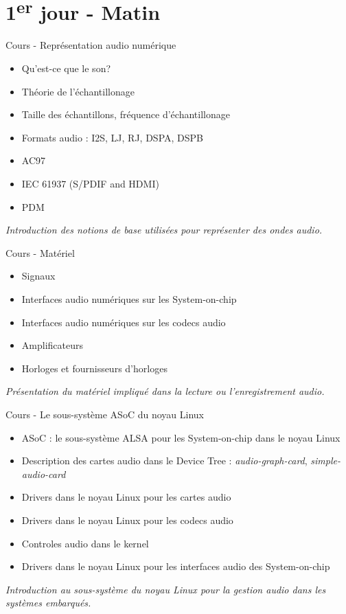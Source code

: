 \documentclass[a4paper,12pt,obeyspaces,spaces,hyphens]{article}
\begin{document}
\feshowtitle

\feshowinfo

\section{1\textsuperscript{er} jour - Matin}

\feagendatwocolumn
{Cours - Représentation audio numérique}
{
  \begin{itemize}
  \item Qu'est-ce que le son?
  \item Théorie de l'échantillonage
  \item Taille des échantillons, fréquence d'échantillonage
  \item Formats audio : I2S, LJ, RJ, DSPA, DSPB
  \item AC97
  \item IEC 61937 (S/PDIF and HDMI)
  \item PDM
  \end{itemize}
  \vspace{0.5em}
  {\em Introduction des notions de base utilisées pour représenter des ondes audio.}
}
{Cours - Matériel}
{
  \begin{itemize}
  \item Signaux
  \item Interfaces audio numériques sur les System-on-chip
  \item Interfaces audio numériques sur les codecs audio
  \item Amplificateurs
  \item Horloges et fournisseurs d'horloges
  \end{itemize}
  \vspace{0.5em}
  {\em Présentation du matériel impliqué dans la lecture ou l'enregistrement audio.}
}

\feagendaonecolumn
{Cours - Le sous-système ASoC du noyau Linux}
{
  \begin{itemize}
  \item ASoC : le sous-système ALSA pour les System-on-chip dans le noyau Linux
  \item Description des cartes audio dans le Device Tree : {\em
      audio-graph-card}, {\em simple-audio-card}
  \item Drivers dans le noyau Linux pour les cartes audio
  \item Drivers dans le noyau Linux pour les codecs audio
  \item Controles audio dans le kernel
  \item Drivers dans le noyau Linux pour les interfaces audio des
    System-on-chip
  \end{itemize}
  \vspace{0.5em}
  {\em Introduction au sous-système du noyau Linux pour la gestion audio dans les systèmes embarqués.}
}
\end{document}
